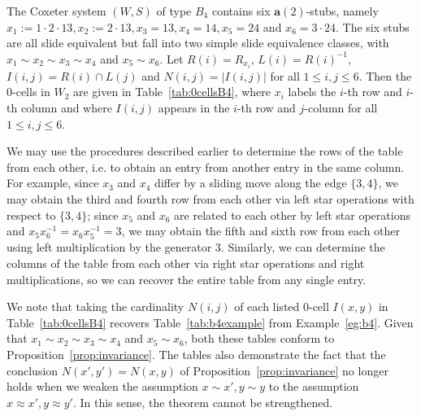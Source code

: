 \documentclass[ALCO,Unicode,published]{cedram}
\newcommand{\la}{\mathbf{a}}
\newcommand{\inverse}{^{-1}}
\newcommand{\abs}[1]{\lvert #1 \rvert}
\begin{document}
 \begin{example}
     \label{eg:0cellsB4}
     The Coxeter system $(W,S)$ of type $B_4$ contains six $\la(2)$-stubs, namely $x_1:=1\cdot
     2\cdot 13, x_2:=2\cdot 13, x_3=13, x_4=14, x_5=24$ and $x_6=3\cdot 24$. The six stubs are all
     slide equivalent but fall into two simple slide equivalence classes, with $x_1\sim x_2\sim
     x_3\sim x_4$ and $x_5\sim x_6$. Let $R(i)=R_{x_i}$, $L(i)=R(i)\inverse$, $I(i,j)=R(i)\cap L(j)$
     and $N(i,j)=\abs{I(i,j)}$ for all $1\le i,j\le 6$. Then the 0-cells in $W_2$ are given in
     Table~\ref{tab:0cellsB4}, where $x_i$ labels the $i$-th row and $i$-th column and where $I(i,j)$
     appears in the $i$-th row and $j$-column for all $1\le i,j\le 6$.

     We may use the procedures described earlier to determine the rows of the table from each other,
     i.e. to obtain an entry from another entry in the same column. For example, since $x_3$ and
     $x_4$ differ by a sliding move along the edge $\{3,4\}$, we may obtain the third and fourth row
     from each other via left  star operations with respect to $\{3,4\}$; since $x_5$ and $x_6$ are
     related to each other by left star operations and $x_5x_6\inverse=x_6x_5\inverse=3$, we may
     obtain the fifth and sixth row from each other using left multiplication by the generator $3$.
     Similarly, we can determine the columns of the table from each other via right star operations
     and right multiplications, so we can recover the entire table from any single entry.
     
     We note that taking the cardinality $N(i,j)$ of each listed 0-cell $I(x,y)$ in
     Table~\ref{tab:0cellsB4} recovers Table~\ref{tab:b4example} from Example~\ref{eg:b4}. Given that $x_1\sim
     x_2\sim x_3\sim x_4$ and $x_5\sim x_6$, both these tables conform to Proposition~\ref{prop:invariance}.
     The tables also demonstrate the fact that the conclusion $N(x',y')=N(x,y)$ of
     Proposition~\ref{prop:invariance} no longer holds when we weaken the assumption $x\sim x',y\sim y$ to the
     assumption $x\approx x', y\approx y'$. In this sense, the theorem cannot be strengthened.


\end{example}
\end{document}
